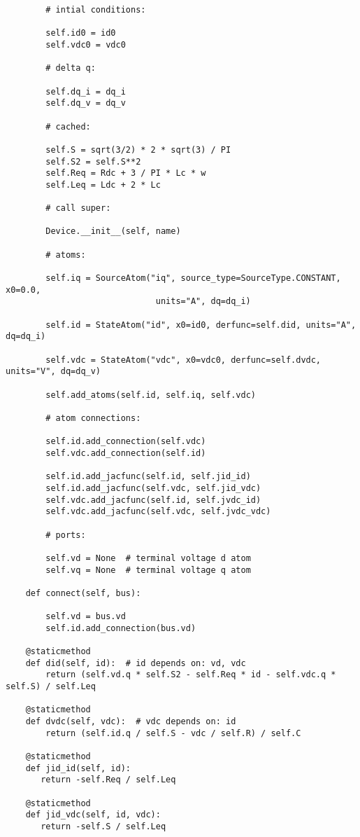 \begin{lstlisting}
        # intial conditions:

        self.id0 = id0
        self.vdc0 = vdc0

        # delta q:

        self.dq_i = dq_i
        self.dq_v = dq_v

        # cached:

        self.S = sqrt(3/2) * 2 * sqrt(3) / PI
        self.S2 = self.S**2
        self.Req = Rdc + 3 / PI * Lc * w
        self.Leq = Ldc + 2 * Lc

        # call super:

        Device.__init__(self, name)

        # atoms:

        self.iq = SourceAtom("iq", source_type=SourceType.CONSTANT, x0=0.0,
                              units="A", dq=dq_i)

        self.id = StateAtom("id", x0=id0, derfunc=self.did, units="A", dq=dq_i)

        self.vdc = StateAtom("vdc", x0=vdc0, derfunc=self.dvdc, units="V", dq=dq_v)

        self.add_atoms(self.id, self.iq, self.vdc)

        # atom connections:

        self.id.add_connection(self.vdc)
        self.vdc.add_connection(self.id)

        self.id.add_jacfunc(self.id, self.jid_id)
        self.id.add_jacfunc(self.vdc, self.jid_vdc)
        self.vdc.add_jacfunc(self.id, self.jvdc_id)
        self.vdc.add_jacfunc(self.vdc, self.jvdc_vdc)

        # ports:

        self.vd = None  # terminal voltage d atom
        self.vq = None  # terminal voltage q atom

    def connect(self, bus):

        self.vd = bus.vd
        self.id.add_connection(bus.vd)

    @staticmethod
    def did(self, id):  # id depends on: vd, vdc
        return (self.vd.q * self.S2 - self.Req * id - self.vdc.q * self.S) / self.Leq

    @staticmethod
    def dvdc(self, vdc):  # vdc depends on: id
        return (self.id.q / self.S - vdc / self.R) / self.C

    @staticmethod
    def jid_id(self, id):
       return -self.Req / self.Leq

    @staticmethod
    def jid_vdc(self, id, vdc):
       return -self.S / self.Leq


\end{lstlisting}
